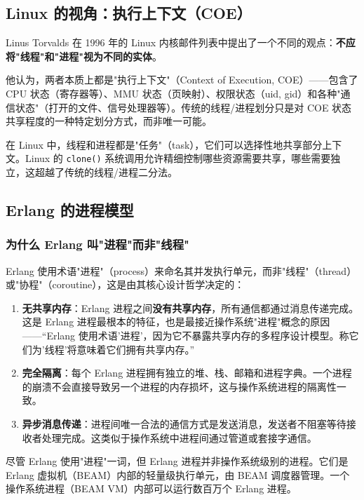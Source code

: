 \subsection{Linux 的视角：执行上下文（COE）}

Linus Torvalds 在 1996 年的 Linux 内核邮件列表中提出了一个不同的观点：\textbf{不应将"线程"和"进程"视为不同的实体}。

他认为，两者本质上都是"执行上下文"（Context of Execution, COE）——包含了 CPU 状态（寄存器等）、MMU 状态（页映射）、权限状态（uid, gid）和各种"通信状态"（打开的文件、信号处理器等）。传统的线程/进程划分只是对 COE 状态共享程度的一种特定划分方式，而非唯一可能。

在 Linux 中，线程和进程都是"任务"（task），它们可以选择性地共享部分上下文。Linux 的 \lstinline|clone()| 系统调用允许精细控制哪些资源需要共享，哪些需要独立，这超越了传统的线程/进程二分法。

\subsection{Erlang 的进程模型}

\subsubsection{为什么 Erlang 叫"进程"而非"线程"}

Erlang 使用术语"进程"（process）来命名其并发执行单元，而非"线程"（thread）或"协程"（coroutine），这是由其核心设计哲学决定的：

\begin{enumerate}[leftmargin=1.5em]
    \item \textbf{无共享内存}：Erlang 进程之间\textbf{没有共享内存}，所有通信都通过消息传递完成。这是 Erlang 进程最根本的特征，也是最接近操作系统"进程"概念的原因——``Erlang 使用术语'进程'，因为它不暴露共享内存的多程序设计模型。称它们为'线程'将意味着它们拥有共享内存。''
    \item \textbf{完全隔离}：每个 Erlang 进程拥有独立的堆、栈、邮箱和进程字典。一个进程的崩溃不会直接导致另一个进程的内存损坏，这与操作系统进程的隔离性一致。
    \item \textbf{异步消息传递}：进程间唯一合法的通信方式是发送消息，发送者不阻塞等待接收者处理完成。这类似于操作系统中进程间通过管道或套接字通信。
\end{enumerate}

\begin{tipbox}
尽管 Erlang 使用"进程"一词，但 Erlang 进程并非操作系统级别的进程。它们是 Erlang 虚拟机（BEAM）内部的轻量级执行单元，由 BEAM 调度器管理。一个操作系统进程（BEAM VM）内部可以运行数百万个 Erlang 进程。
\end{tipbox}

